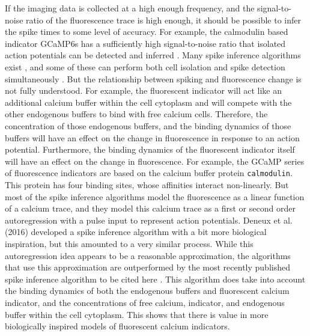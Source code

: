 If the imaging data is collected at a high enough frequency, and the signal-to-noise ratio of the fluorescence trace is high enough, it should be possible to infer the spike times to some level of accuracy. For example, the calmodulin based indicator GCaMP6s has a sufficiently high signal-to-noise ratio that isolated action potentials can be detected and inferred \parencite{chen}. Many spike inference algorithms exist \parencite{vogelstein, pnevmatikakis, friedrich, paninski1, paninski2, deneux, greenberg}, and some of these can perform both cell isolation and spike detection simultaneously \parencite{vogelstein, pnevmatikakis, paninski2, deneux}. But the relationship between spiking and fluorescence change is not fully understood. For example, the fluorescent indicator will act like an additional calcium buffer within the cell cytoplasm and will compete with the other endogenous buffers to bind with free calcium cells. Therefore, the concentration of those endogenous buffers, and the binding dynamics of those buffers will have an effect on the change in fluorescence in response to an action potential. Furthermore, the binding dynamics of the fluorescent indicator itself will have an effect on the change in fluorescence. For example, the GCaMP series of fluorescence indicators are based on the calcium buffer protein \texttt{calmodulin}. This protein has four binding sites, whose affinities interact non-linearly. But most of the spike inference algorithms model the fluorescence as a linear function of a calcium trace, and they model this calcium trace as a first or second order autoregression with a pulse input to represent action potentials. Deneux et al. (2016) developed a spike inference algorithm with a bit more biological inspiration, but this amounted to a very similar process. While this autoregression idea appears to be a reasonable approximation, the algorithms that use this approximation are outperformed by the most recently published spike inference algorithm to be cited here \parencite{greenberg}. This algorithm does take into account the binding dynamics of both the endogenous buffers and fluorescent calcium indicator, and the concentrations of free calcium, indicator, and endogenous buffer within the cell cytoplasm. This shows that there is value in more biologically inspired models of fluorescent calcium indicators.

